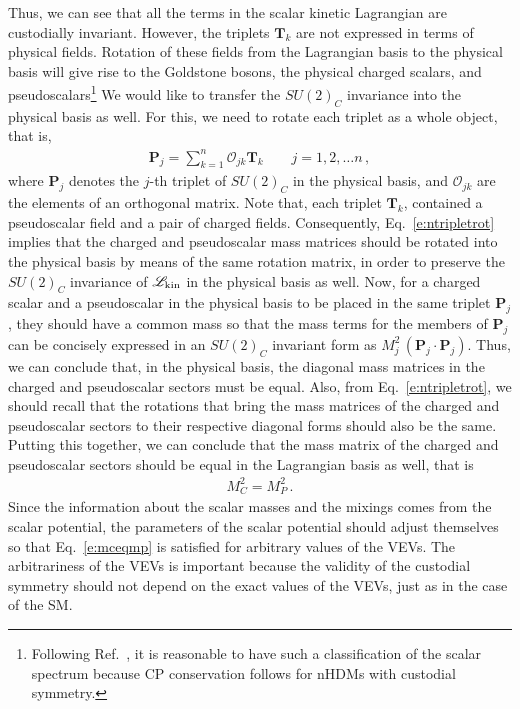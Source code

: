 \documentclass[11pt]{article}
\newcommand{\lag}[1]{\mathscr{L}_{\rm #1}}
\def\revision#1{\textcolor{blue}{#1}}
\begin{document}
Thus, we can see that all the terms in the scalar kinetic Lagrangian are custodially invariant.  
However, the triplets $\mathbf{T}_k$ are not expressed in terms of physical fields.  
Rotation of these fields from the Lagrangian basis to the physical basis will give rise to the Goldstone bosons, the physical charged scalars, and pseudoscalars\footnote{Following Ref.~\cite{Nishi:2011gc}, it is reasonable to have  such a classification of the scalar spectrum because CP conservation follows for nHDMs with custodial symmetry.} 
We would like to transfer the $SU(2)_C$ invariance into the physical basis as well.  
For this, we need to rotate each triplet as a whole object, that is,
%
\begin{eqnarray}
	\label{e:ntripletrot}
	\mathbf{P}_j= \sum_{k=1}^{n} \mathcal{O}_{jk}\mathbf{T}_k \quad \quad j=1,2,\dots n \,,
\end{eqnarray}
%
where $\mathbf{P}_j$ denotes the $j$-th triplet of $SU(2)_C$ in the physical basis, and $\mathcal{O}_{jk}$ are the elements of an orthogonal matrix.  
Note that, each triplet $\mathbf{T}_k$, contained a pseudoscalar field and a pair of charged fields.  
Consequently, Eq.~\eqref{e:ntripletrot} implies that the charged and pseudoscalar mass matrices should be rotated into the physical basis by means of the same rotation matrix, in order to preserve the $SU(2)_C$ invariance of $\lag{kin}$ in the physical basis as well.  
Now, for a charged scalar and a pseudoscalar in the physical basis to be placed in the same triplet $\mathbf{P}_j$, they should have a common mass so that the mass terms for the members of $\mathbf{P}_j$ can be concisely expressed in an $SU(2)_C$ invariant form as $M_j^2 \, (\mathbf{P}_j \cdot \mathbf{P}_j)$.  
Thus, we can conclude that, in the physical basis, the diagonal mass matrices in the charged and pseudoscalar sectors must be equal.  
Also, from Eq.~\eqref{e:ntripletrot}, we should recall that the rotations that bring the mass matrices of the charged and pseudoscalar sectors to their respective diagonal forms should also be the same.  
Putting this together, we can conclude that the mass matrix of the charged and pseudoscalar sectors should be equal in the Lagrangian basis as well, that is
%
\begin{eqnarray}
	\label{e:mceqmp}
	M_{C}^2=M_{P}^2 \,.
\end{eqnarray}
%
Since the information about the scalar masses and the mixings comes from the scalar potential, the parameters of the scalar potential should adjust themselves so that Eq.~\eqref{e:mceqmp} is satisfied for arbitrary values of the VEVs. 
The arbitrariness of the VEVs is important because the validity of the custodial symmetry should not depend on the exact values of the VEVs, just as in the case of the SM.
\end{document}
